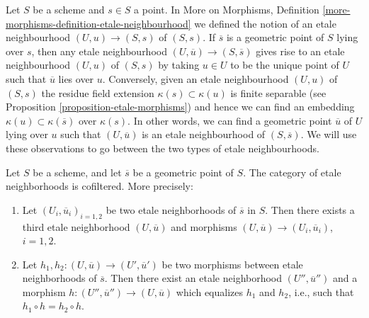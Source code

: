 \begin{remark}
\label{remark-etale-neighbourhoods}
Let $S$ be a scheme and $s \in S$ a point. In
More on Morphisms,
Definition \ref{more-morphisms-definition-etale-neighbourhood}
we defined the notion of an etale neighbourhood $(U, u) \to (S, s)$
of $(S, s)$. If $\overline{s}$ is a geometric point of $S$ lying over
$s$, then any etale neighbourhood $(U, \overline{u}) \to (S, \overline{s})$
gives rise to an etale neighbourhood $(U, u)$ of $(S, s)$ by taking
$u \in U$ to be the unique point of $U$ such that $\overline{u}$
lies over $u$. Conversely, given an etale neighbourhood $(U, u)$
of $(S, s)$ the residue field extension $\kappa(s) \subset \kappa(u)$
is finite separable (see
Proposition \ref{proposition-etale-morphisms})
and hence we can find an embedding $\kappa(u) \subset \kappa(\overline{s})$
over $\kappa(s)$. In other words, we can find a geometric point
$\overline{u}$ of $U$ lying over $u$ such that $(U, \overline{u})$
is an etale neighbourhood of $(S, \overline{s})$.
We will use these observations to go between the two types of
etale neighbourhoods.
\end{remark}

\begin{lemma}
\label{lemma-cofinal-etale}
Let $S$ be a scheme, and let $\overline{s}$ be a geometric point of $S$.
The category of etale neighborhoods is cofiltered. More precisely:
\begin{enumerate}
\item Let $(U_i, \overline{u}_i)_{i=1, 2}$ be two etale neighborhoods of
$\overline{s}$ in $S$. Then there exists a third etale neighborhood
$(U, \overline{u})$ and morphisms
$(U, \overline{u}) \to (U_i, \overline{u}_i)$, $i = 1, 2$.
\item Let $h_1, h_2: (U, \overline{u}) \to (U', \overline{u}')$ be two
morphisms between etale neighborhoods of $\overline{s}$. Then there exist an
etale neighborhood $(U'', \overline{u}'')$ and a morphism
$h : (U'', \overline{u}'') \to (U, \overline{u})$
which equalizes $h_1$ and $h_2$, i.e., such that
$h_1 \circ h = h_2 \circ h$.		
\end{enumerate}
\end{lemma}

